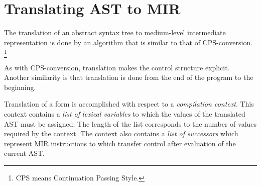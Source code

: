 \chapter{Translating AST to MIR}
\label{chap-translating-ast-to-mir}

The translation of an abstract syntax tree
 to medium-level intermediate
representation  is done by an algorithm that is
similar to that of CPS-conversion.%
\footnote{CPS means Continuation Passing Style.}

As with CPS-conversion, translation makes the control structure
explicit.  Another similarity is that translation is done from the end
of the program to the beginning.

Translation of a form is accomplished with respect to a
\emph{compilation context}.  This context contains a \emph{list of
  lexical variables} to which the values of the translated AST must be
assigned.  The length of the list corresponds to the number of values
required by the context.  The context also contains a \emph{list of
  successors} which represent MIR instructions to which transfer
control after evaluation of the current AST.

